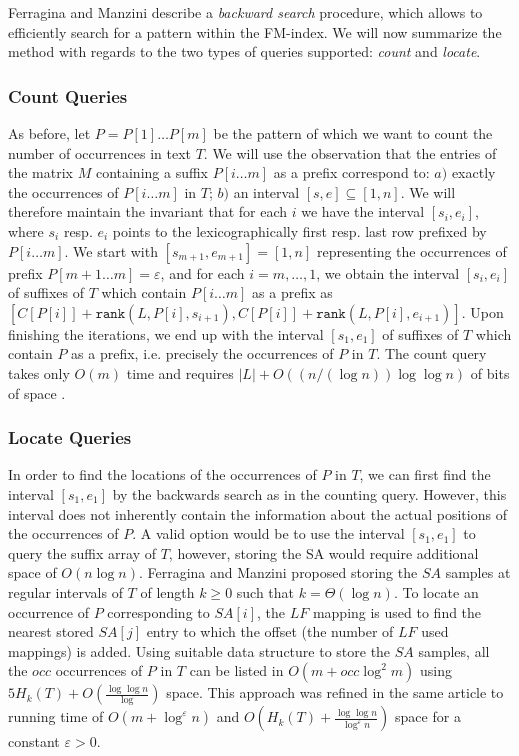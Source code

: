 Ferragina and Manzini describe a \textit{backward search} procedure, which allows to efficiently search for a pattern within the FM-index. We will now summarize the method with regards to the two types of queries supported: \textit{count} and \textit{locate}.

\subsubsection{Count Queries}
As before, let $P = P[1] \ldots P[m]$ be the pattern of which we want to count the number of occurrences in text $T$. We will use the observation that the entries of the matrix $M$ containing a suffix $P[i \ldots m]$ as a prefix correspond to: $a)$ exactly the occurrences of $P[i \ldots m]$ in $T$; $b)$ an interval $[s,e] \subseteq [1, n]$. We will therefore maintain the invariant that for each $i$ we have the interval $[s_i, e_i]$, where $s_i$ resp. $e_i$ points to the lexicographically first resp. last row prefixed by $P[i \ldots m]$. We start with $[s_{m+1}, e_{m+1}] = [1, n]$ representing the occurrences of prefix $P[m+1 \ldots m] = \varepsilon$, and for each  $i = m, \ldots, 1$, we obtain the interval $[s_i, e_i]$ of suffixes of $T$ which contain $P[i \ldots m]$ as a prefix as $[C[P[i]] + \texttt{rank}(L, P[i],s_{i+1}), C[P[i]] + \texttt{rank}(L, P[i], e_{i+1})]$. Upon finishing the iterations, we end up with the interval $[s_1, e_1]$ of suffixes of $T$ which contain $P$ as a prefix, i.e. precisely the occurrences of $P$ in $T$. The count query takes only $O(m)$ time and requires $|L| + O((n/(\log n)) \log \log n)$ of bits of space \cite{fmindex2000manzini}.

\subsubsection{Locate Queries}
In order to find the locations of the occurrences of $P$ in $T$, we can first find the interval $[s_1, e_1]$ by the backwards search as in the counting query. However, this interval does not inherently contain the information about the actual positions of the occurrences of $P$. A valid option would be to use the interval $[s_1, e_1]$ to query the suffix array of $T$, however, storing the SA would require additional space of $O(n \log n)$. Ferragina and Manzini \cite{fmindex2000manzini} proposed storing the $SA$ samples at regular intervals of $T$ of length $k \geq 0$ such that $k = \Theta(\log n)$. To locate an occurrence of $P$ corresponding to $SA[i]$, the $LF$ mapping is used to find the nearest stored $SA[j]$ entry to which the offset (the number of $LF$ used mappings) is added. Using suitable data structure to store the $SA$ samples, all the $occ$ occurrences of $P$ in $T$ can be listed in $O(m + occ \log^2 m)$ using $5 H_k(T) + O(\frac{\log \log n}{\log})$ space. This approach was refined in the same article to running time of $O(m + \log^{\varepsilon} n)$ and $O(H_k(T) + \frac{\log \log n}{\log^{\varepsilon} n})$ space for a constant $\varepsilon > 0$.

